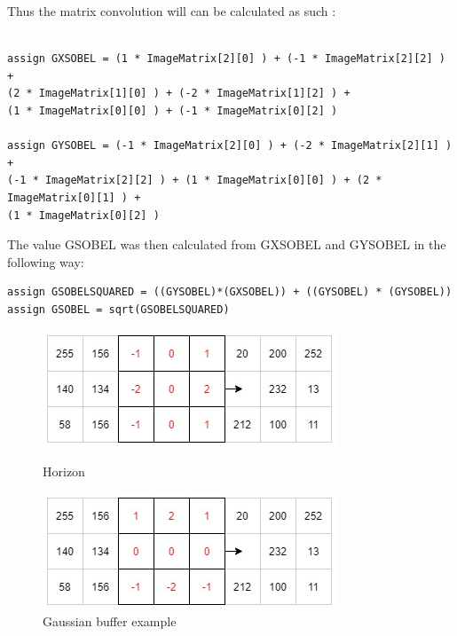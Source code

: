\documentclass[10pt,twoside]{article}
\begin{document}
Thus the matrix convolution will can be calculated as such :
\begin{verbatim}

assign GXSOBEL = (1 * ImageMatrix[2][0] ) + (-1 * ImageMatrix[2][2] ) + 
(2 * ImageMatrix[1][0] ) + (-2 * ImageMatrix[1][2] ) + 
(1 * ImageMatrix[0][0] ) + (-1 * ImageMatrix[0][2] )

assign GYSOBEL = (-1 * ImageMatrix[2][0] ) + (-2 * ImageMatrix[2][1] ) + 
(-1 * ImageMatrix[2][2] ) + (1 * ImageMatrix[0][0] ) + (2 * ImageMatrix[0][1] ) + 
(1 * ImageMatrix[0][2] )

\end{verbatim}
The value GSOBEL was then calculated from GXSOBEL and GYSOBEL in the following way: 
\begin{verbatim}
assign GSOBELSQUARED = ((GYSOBEL)*(GXSOBEL)) + ((GYSOBEL) * (GYSOBEL)) 
assign GSOBEL = sqrt(GSOBELSQUARED)
\end{verbatim}

\begin{figure}[!htb]
\begin{minipage}{.49\textwidth}
        \includegraphics[scale = 0.55]{GX.jpg}
        \centering
        \caption{Horizon}
        \label{fig:InitalDesign}
\end{minipage}
\begin{minipage}{.49\textwidth}
        \includegraphics[scale = 0.55]{GY.jpg}
        \centering
        \caption{Gaussian buffer example}
        \label{fig:InitalDesign}
\end{minipage}
\end{figure}
\end{document}
